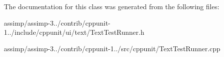 The documentation for this class was generated from the following files\+:\begin{DoxyCompactItemize}
\item 
assimp/assimp-\/3../contrib/cppunit-\/1../include/cppunit/ui/text/Text\+Test\+Runner.\+h\item 
assimp/assimp-\/3../contrib/cppunit-\/1../src/cppunit/Text\+Test\+Runner.\+cpp\end{DoxyCompactItemize}
